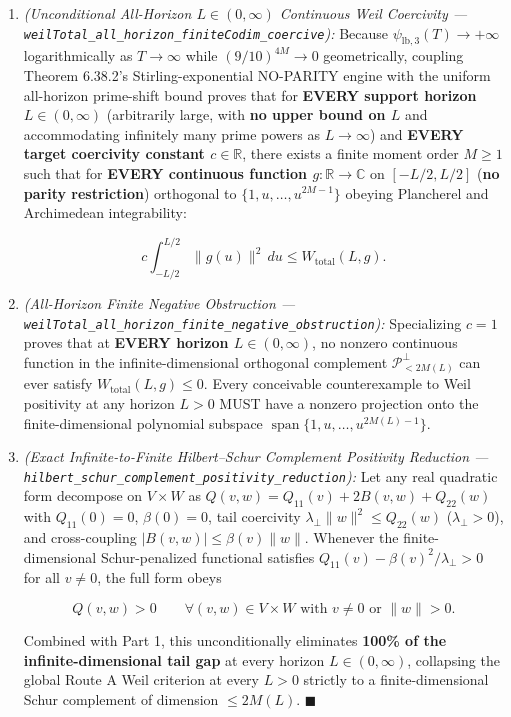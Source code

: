 \documentclass[
  11pt,
]{article}
\begin{document}
\begin{enumerate}
\def\labelenumi{\arabic{enumi}.}
\item
  \emph{(Unconditional All-Horizon \(L \in (0, \infty)\) Continuous Weil
  Coercivity ---
  \texttt{weilTotal\_all\_horizon\_finiteCodim\_coercive}):} Because
  \(\psi_{\text{lb},3}(T) \to +\infty\) logarithmically as
  \(T \to \infty\) while \((9/10)^{4M} \to 0\) geometrically, coupling
  Theorem 6.38.2's Stirling-exponential NO-PARITY engine with the
  uniform all-horizon prime-shift bound proves that for \textbf{EVERY
  support horizon \(L \in (0, \infty)\)} (arbitrarily large, with
  \textbf{no upper bound on \(L\)} and accommodating infinitely many
  prime powers as \(L \to \infty\)) and \textbf{EVERY target coercivity
  constant \(c \in \mathbb{R}\)}, there exists a finite moment order
  \(M \ge 1\) such that for \textbf{EVERY continuous function
  \(g : \mathbb{R} \to \mathbb{C}\)} on \([-L/2, L/2]\) (\textbf{no
  parity restriction}) orthogonal to \(\{1, u, \dots, u^{2M-1}\}\)
  obeying Plancherel and Archimedean integrability:

  \[c \int_{-L/2}^{L/2} \|g(u)\|^2\,du \le W_{\text{total}}(L, g).\]
\item
  \emph{(All-Horizon Finite Negative Obstruction ---
  \texttt{weilTotal\_all\_horizon\_finite\_negative\_obstruction}):}
  Specializing \(c = 1\) proves that at \textbf{EVERY horizon
  \(L \in (0, \infty)\)}, no nonzero continuous function in the
  infinite-dimensional orthogonal complement
  \(\mathcal{P}_{<2M(L)}^\perp\) can ever satisfy
  \(W_{\text{total}}(L, g) \le 0\). Every conceivable counterexample to
  Weil positivity at any horizon \(L > 0\) MUST have a nonzero
  projection onto the finite-dimensional polynomial subspace
  \(\operatorname{span}\{1, u, \dots, u^{2M(L)-1}\}\).
\item
  \emph{(Exact Infinite-to-Finite Hilbert--Schur Complement Positivity
  Reduction ---
  \texttt{hilbert\_schur\_complement\_positivity\_reduction}):} Let any
  real quadratic form decompose on \(V \times W\) as
  \(Q(v, w) = Q_{11}(v) + 2B(v, w) + Q_{22}(w)\) with \(Q_{11}(0) = 0\),
  \(\beta(0) = 0\), tail coercivity
  \(\lambda_\perp \|w\|^2 \le Q_{22}(w)\) (\(\lambda_\perp > 0\)), and
  cross-coupling \(|B(v, w)| \le \beta(v)\|w\|\). Whenever the
  finite-dimensional Schur-penalized functional satisfies
  \(Q_{11}(v) - \beta(v)^2/\lambda_\perp > 0\) for all \(v \neq 0\), the
  full form obeys

  \[Q(v, w) > 0 \qquad \forall (v, w) \in V \times W \text{ with } v \neq 0 \text{ or } \|w\| > 0.\]

  Combined with Part 1, this unconditionally eliminates \textbf{100\% of
  the infinite-dimensional tail gap} at every horizon
  \(L \in (0, \infty)\), collapsing the global Route A Weil criterion at
  every \(L > 0\) strictly to a finite-dimensional Schur complement of
  dimension \(\le 2M(L)\). \(\blacksquare\)
\end{enumerate}
\end{document}
